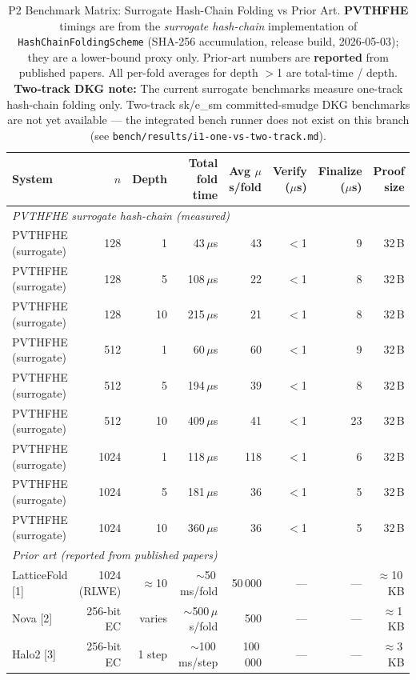\documentclass[10pt]{article}
\begin{document}
\begin{table}[ht]
\centering
\caption{%
  P2 Benchmark Matrix: Surrogate Hash-Chain Folding vs Prior Art.
  \textbf{PVTHFHE} timings are from the \emph{surrogate hash-chain}
  implementation of \texttt{HashChainFoldingScheme} (SHA-256 accumulation, release
  build, 2026-05-03); they are a lower-bound proxy only.
  Prior-art numbers are \textbf{reported} from published papers.
  All per-fold averages for depth $>$1 are total-time / depth.
  \\[4pt]
  \textbf{Two-track DKG note:} The current surrogate benchmarks measure one-track
  hash-chain folding only. Two-track sk/e\_sm committed-smudge DKG benchmarks are not
  yet available — the integrated bench runner does not exist on this branch
  (see \texttt{bench/results/i1-one-vs-two-track.md}).
}
\label{tab:p2-bench}
\footnotesize
\begin{tabular}{lrrrrrrr}
\toprule
\textbf{System} &
\textbf{$n$} &
\textbf{Depth} &
\textbf{Total fold time} &
\textbf{Avg $\mu$s/fold} &
\textbf{Verify ($\mu$s)} &
\textbf{Finalize ($\mu$s)} &
\textbf{Proof size} \\
\midrule
\multicolumn{8}{l}{\textit{PVTHFHE surrogate hash-chain (measured)}} \\
\midrule
PVTHFHE (surrogate) & 128  & 1  &  43\,$\mu$s &  43 & $<$1 & 9  & 32\,B \\
PVTHFHE (surrogate) & 128  & 5  & 108\,$\mu$s &  22 & $<$1 & 8  & 32\,B \\
PVTHFHE (surrogate) & 128  & 10 & 215\,$\mu$s &  21 & $<$1 & 8  & 32\,B \\
PVTHFHE (surrogate) & 512  & 1  &  60\,$\mu$s &  60 & $<$1 & 9  & 32\,B \\
PVTHFHE (surrogate) & 512  & 5  & 194\,$\mu$s &  39 & $<$1 & 8  & 32\,B \\
PVTHFHE (surrogate) & 512  & 10 & 409\,$\mu$s &  41 & $<$1 & 23  & 32\,B \\
PVTHFHE (surrogate) & 1024 & 1  & 118\,$\mu$s & 118 & $<$1 & 6  & 32\,B \\
PVTHFHE (surrogate) & 1024 & 5  & 181\,$\mu$s &  36 & $<$1 & 5  & 32\,B \\
PVTHFHE (surrogate) & 1024 & 10 & 360\,$\mu$s &  36 & $<$1 & 5  & 32\,B \\
\midrule
\multicolumn{8}{l}{\textit{Prior art (reported from published papers)}} \\
\midrule
LatticeFold [1]  & 1024 (RLWE) & $\approx$10 & $\sim$50\,ms/fold & 50\,000 & — & — & $\approx$10\,KB \\
Nova [2]         & 256-bit EC  & varies      & $\sim$500\,$\mu$s/fold & 500  & — & — & $\approx$1\,KB  \\
Halo2 [3]        & 256-bit EC  & 1 step      & $\sim$100\,ms/step    & 100\,000 & — & — & $\approx$3\,KB \\
\bottomrule
\end{tabular}


\end{table}
\end{document}

